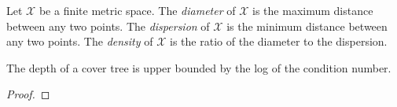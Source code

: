 \documentclass[../main.tex]{subfiles}
\newcommand{\set}[1]{\mathcal {#1}}
\begin{document}
\begin{definition}
    Let $\set X$ be a finite metric space.
    The \emph{diameter} of $\set X$ is the maximum distance between any two points.
    The \emph{dispersion} of $\set X$ is the minimum distance between any two points.
    The \emph{density} of $\set X$ is the ratio of the diameter to the dispersion.
\end{definition}

\begin{lemma}
    The depth of a cover tree is upper bounded by the log of the condition number.
\end{lemma}

\begin{proof}
\end{proof}
\end{document}
